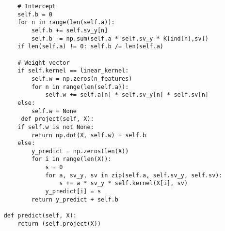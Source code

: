\documentclass{article}
\begin{document}
\begin{verbatim}
        # Intercept
        self.b = 0
        for n in range(len(self.a)):
            self.b += self.sv_y[n]
            self.b -= np.sum(self.a * self.sv_y * K[ind[n],sv])
        if len(self.a) != 0: self.b /= len(self.a)

        # Weight vector
        if self.kernel == linear_kernel:
            self.w = np.zeros(n_features)
            for n in range(len(self.a)):
                self.w += self.a[n] * self.sv_y[n] * self.sv[n]
        else:
            self.w = None
         def project(self, X):
        if self.w is not None:
            return np.dot(X, self.w) + self.b
        else:
            y_predict = np.zeros(len(X))
            for i in range(len(X)):
                s = 0
                for a, sv_y, sv in zip(self.a, self.sv_y, self.sv):
                    s += a * sv_y * self.kernel(X[i], sv)
                y_predict[i] = s
            return y_predict + self.b

    def predict(self, X):
        return (self.project(X))
\end{verbatim}
\end{document}
